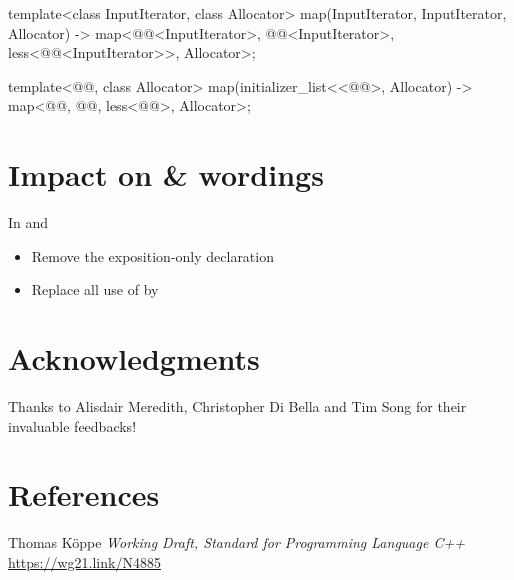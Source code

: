 \documentclass{wg21}
\begin{document}
\begin{codeblock}
{    template<class InputIterator, class Allocator>
    map(InputIterator, InputIterator, Allocator)
    -> map<@@<InputIterator>, @@<InputIterator>,
    less<@@<InputIterator>>, Allocator>;

    template<@@, class Allocator>
    map(initializer_list<<@@>, Allocator)
    -> map<@@, @@, less<@@>, Allocator>;
}
\end{codeblock}




\section{Impact on  \&  wordings}

In  and 


\begin{itemize}
\item Remove the exposition-only  declaration
\item Replace all use of  by 
\end{itemize}

\section{Acknowledgments}

Thanks to Alisdair Meredith, Christopher Di Bella and Tim Song for their invaluable feedbacks!

\section{References}
\renewcommand{\section}[2]{}%



\begin{thebibliography}{9}

Thomas Köppe
\emph{Working Draft, Standard for Programming Language C++}\newline
\url{https://wg21.link/N4885}


\end{thebibliography}
\end{document}
